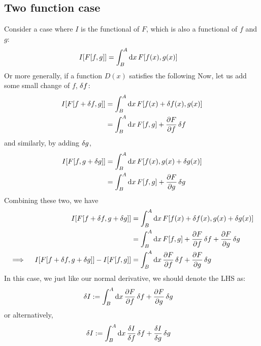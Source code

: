 \subsection{Two function case}
Consider a case where $I$ is the functional of $F$, which is also a functional of $f$ and $g$:
\begin{align}
  I[F[f, g]] & = \int_B^A \odif{x} \, F[f(x), g(x)]
\end{align}
Or more generally, if a function $D(x)$ satisfies the following
Now, let us add some small change of $f$, $\fdif{f}$:
\begin{align}
  I[F[f + \fdif{f}, g]] & = \int_B^A \odif{x} \, F[f(x) + \fdif{f}(x), g(x)]   \\
                        & = \int_B^A \odif{x} \, F[f, g] + \pdv{F}{f} \fdif{f}
\end{align}
and similarly, by adding $\fdif{g}$,
\begin{align}
  I[F[f, g + \fdif{g}]] & = \int_B^A \odif{x} \, F[f(x), g(x) + \fdif{g}(x)]   \\
                        & = \int_B^A \odif{x} \, F[f, g] + \pdv{F}{g} \fdif{g}
\end{align}
Combining these two, we have
\begin{align}
  I[F[f + \fdif{f}, g + \fdif{g}]]                         & = \int_B^A \odif{x} \, F[f(x) + \fdif{f}(x), g(x) + \fdif{g}(x)]           \\
                                                           & = \int_B^A \odif{x} \, F[f, g] + \pdv{F}{f} \fdif{f} + \pdv{F}{g} \fdif{g} \\
  \implies \quad I[F[f+\fdif{f}, g+\fdif{g}]] - I[F[f, g]] & = \int_B^A \odif{x} \, \pdv{F}{f} \fdif{f} + \pdv{F}{g} \fdif{g}
\end{align}
In this case, we just like our normal derivative, we should denote the LHS as:
\begin{align}
  \fdif{I} & := \int_B^A \odif{x} \, \pdv{F}{f} \fdif{f} + \pdv{F}{g} \fdif{g}
\end{align}
or alternatively,
\begin{align}
  \fdif{I} & := \int_B^A \odif{x} \, \fdv{I}{f} \fdif{f} + \fdv{I}{g} \fdif{g}
\end{align}

